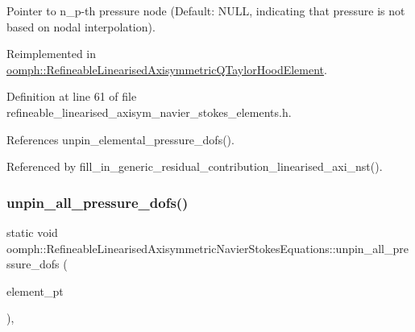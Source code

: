 Pointer to n\+\_\+p-\/th pressure node (Default\+: N\+U\+LL, indicating that pressure is not based on nodal interpolation). 



Reimplemented in \hyperlink{classoomph_1_1RefineableLinearisedAxisymmetricQTaylorHoodElement_a88e21349662f0584dc329ac7260ddf6d}{oomph\+::\+Refineable\+Linearised\+Axisymmetric\+Q\+Taylor\+Hood\+Element}.



Definition at line 61 of file refineable\+\_\+linearised\+\_\+axisym\+\_\+navier\+\_\+stokes\+\_\+elements.\+h.



References unpin\+\_\+elemental\+\_\+pressure\+\_\+dofs().



Referenced by fill\+\_\+in\+\_\+generic\+\_\+residual\+\_\+contribution\+\_\+linearised\+\_\+axi\+\_\+nst().

\mbox{\label{classoomph_1_1RefineableLinearisedAxisymmetricNavierStokesEquations_ab836fb5486bd541fd1eb7759b04f90cc}} 
\subsubsection{\texorpdfstring{unpin\+\_\+all\+\_\+pressure\+\_\+dofs()}{unpin\_all\_pressure\_dofs()}}
{\footnotesize\ttfamily static void oomph\+::\+Refineable\+Linearised\+Axisymmetric\+Navier\+Stokes\+Equations\+::unpin\+\_\+all\+\_\+pressure\+\_\+dofs (\begin{DoxyParamCaption}\item[{const \hyperlink{classoomph_1_1Vector}{Vector}$<$ \hyperlink{classoomph_1_1GeneralisedElement}{Generalised\+Element} $\ast$$>$ \&}]{element\+\_\+pt }\end{DoxyParamCaption})\hspace{0.3cm}{\ttfamily [inline]}, {\ttfamily [static]}}



